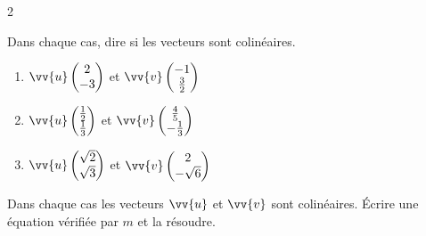 \documentclass[main.tex]{subfiles}
\begin{document}
\begin{multicols}{2}
\begin{exercise}
Dans chaque cas, dire si les vecteurs sont colinéaires. 
\begin{enumerate}[label=\alph*),leftmargin=*]
\item  $\vv{u}\begin{pmatrix}
2\\-3 
\end{pmatrix}$ et $\vv{v}\begin{pmatrix}
-1\\\tfrac{3}{2} 
\end{pmatrix}$  
\vspace{0.5cm}
\item  $\vv{u}\begin{pmatrix}
\tfrac{1}{2}\\\tfrac{1}{3} 
\end{pmatrix}$ et $\vv{v}\begin{pmatrix}
\tfrac{4}{5}\\ -\tfrac{1}{3}
\end{pmatrix}$  
\vspace{0.5cm}
\item  $\vv{u}\begin{pmatrix}
\sqrt{2}\\\sqrt{3} 
\end{pmatrix}$ et $\vv{v}\begin{pmatrix}
2\\ -\sqrt{6}
\end{pmatrix}$  
\vspace{0.5cm} 
\end{enumerate}
\end{exercise}
\begin{exercise}Dans chaque cas les vecteurs $\vv{u}$ et $\vv{v}$ sont colinéaires. Écrire une équation vérifiée par $m$ et la résoudre.   
\end{exercise}
\end{multicols}
\end{document}
